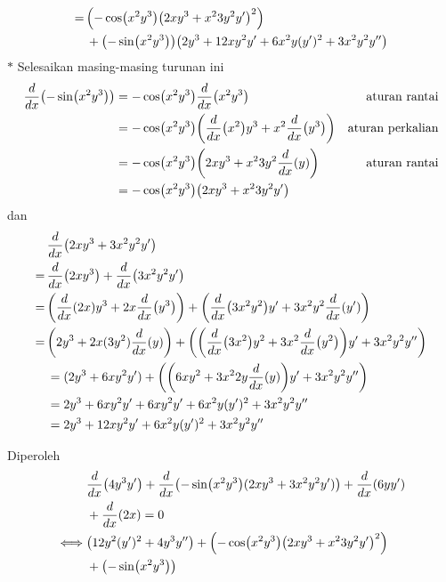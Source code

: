 \begin{enumerate}[leftmargin=*, label={\arabic*}.]
\begin{enumerate}[label={\alph*}.]
\begin{enumerate}[label={\arabic*})]
\begin{align*}
        =\,&\bracket*{-\cos\bracket*{x^{2}y^{3}}\bracket*{2xy^{3}+x^{2}3y^{2}y'}^{2}}
        \\&+\bracket*{-\sin\bracket*{x^{2}y^{3}}}
        \bracket*{2y^{3}+12xy^{2}y'+6x^{2}y(y')^{2}+3x^{2}y^{2}y''}
    \end{align*}
    $*$ Selesaikan masing-masing turunan ini
    \begin{align*}
        \drv{x}{-\sin\bracket*{x^{2}y^{3}}}
        &=-\cos\bracket*{x^{2}y^{3}}\drv{x}{x^{2}y^{3}}
        &\text{aturan rantai}\\
        &=-\cos\bracket*{x^{2}y^{3}}
        \bracket*{\drv{x}{x^{2}}y^{3}+x^{2}\drv{x}{y^{3}}}
        &\text{aturan perkalian}\\
        &=-\cos\bracket*{x^{2}y^{3}}
        \bracket*{2xy^{3}+x^{2}3y^{2}\drv{x}{y}}
        &\text{aturan rantai}\\
        &=-\cos\bracket*{x^{2}y^{3}}
        \bracket*{2xy^{3}+x^{2}3y^{2}y'}
    \end{align*}
    dan
    \begin{align*}
        &\drv{x}{2xy^{3}+3x^{2}y^{2}y'} \\
        =\,&\drv{x}{2xy^{3}}+\drv{x}{3x^{2}y^{2}y'}\\
        =\,&\bracket*{\drv{x}{2x}y^{3}+2x\drv{x}{y^{3}}}
        +\bracket*{\drv{x}{3x^{2}y^{2}}y'+3x^{2}y^{2}\drv{x}{y'}}\\
        =\,&\bracket*{2y^{3}+2x(3y^2)\drv{x}{y}}
        +\bracket*{\bracket*{\drv{x}{3x^{2}}y^2+3x^{2}\drv{x}{y^2}}y'
        +3x^{2}y^{2}y''}\\
        &=(2y^{3}+6xy^{2}y')+\bracket*{\bracket*{6xy^{2}+3x^{2}2y\drv{x}{y}}y'
        +3x^{2}y^{2}y''}\\
        &=2y^{3}+6xy^{2}y'+6xy^{2}y'+6x^{2}y(y')^{2}+3x^{2}y^{2}y''\\
        &=2y^{3}+12xy^{2}y'+6x^{2}y(y')^{2}+3x^{2}y^{2}y''\\
    \end{align*}
    \end{enumerate}
    Diperoleh
    \begin{align*}
        &\drv{x}{4y^{3}y'}+\drv{x}{-\sin\bracket*{x^{2}y^{3}}(2xy^{3}+3x^{2}y^{2}y')}
        +\drv{x}{6yy'}\\
        &+\drv{x}{2x}=0\\
        \iff &\bracket*{12y^{2}(y')^{2}+4y^{3}y''}
        +\bracket*{-\cos\bracket*{x^{2}y^{3}}\bracket*{2xy^{3}+x^{2}3y^{2}y'}^{2}}
        \\&+\bracket*{-\sin\bracket*{x^{2}y^{3}}}

\end{align*}
\end{enumerate}
\end{enumerate}
